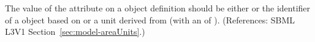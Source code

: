 The value of the  attribute on a \Model object definition
should be either  or the identifier of a \UnitDefinition
object based on  or a unit derived from 
(with an  of ).  (References:
SBML L3V1 Section~\ref{sec:model-areaUnits}.)
